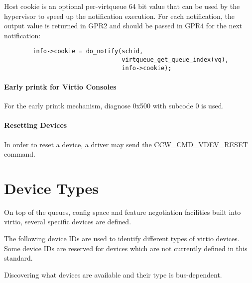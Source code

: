 Host cookie is an optional per-virtqueue 64 bit value that can be
used by the hypervisor to speed up the notification execution.
For each notification, the output value is returned in GPR2 and
should be passed in GPR4 for the next notification:

\begin{lstlisting}
        info->cookie = do_notify(schid,
                                 virtqueue_get_queue_index(vq),
                                 info->cookie);
\end{lstlisting}

\subsubsection{Early printk for Virtio Consoles}\label{sec:Virtio Transport Options / Virtio over channel I/O / Device Operation / Early printk for Virtio Consoles}

For the early printk mechanism, diagnose 0x500 with subcode 0 is
used.

\subsubsection{Resetting Devices}\label{sec:Virtio Transport Options / Virtio over channel I/O / Device Operation / Resetting Devices}

In order to reset a device, a driver may send the
CCW_CMD_VDEV_RESET command.


\chapter{Device Types}\label{sec:Device Types}

On top of the queues, config space and feature negotiation facilities
built into virtio, several specific devices are defined.

The following device IDs are used to identify different types of virtio
devices.  Some device IDs are reserved for devices which are not currently
defined in this standard.

Discovering what devices are available and their type is bus-dependent.

